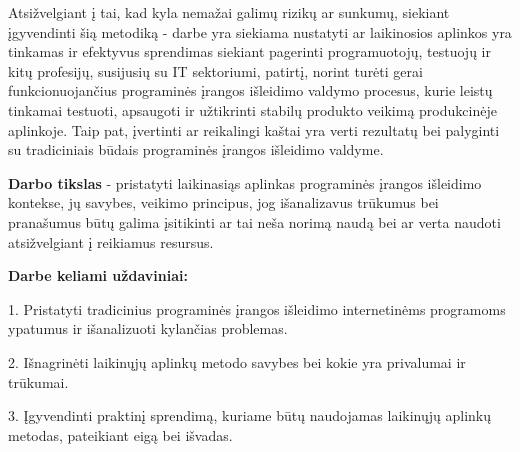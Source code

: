\documentclass{VUMIFPSkursinis}
\begin{document}
 Atsižvelgiant į tai, kad kyla nemažai galimų rizikų ar sunkumų, siekiant įgyvendinti šią metodiką - darbe yra siekiama nustatyti ar laikinosios aplinkos yra tinkamas ir efektyvus sprendimas siekiant pagerinti programuotojų, testuojų ir kitų profesijų, susijusių su IT sektoriumi, patirtį, norint turėti gerai funkcionuojančius programinės įrangos išleidimo valdymo procesus, kurie leistų tinkamai testuoti, apsaugoti ir užtikrinti stabilų produkto veikimą produkcinėje aplinkoje. Taip pat, įvertinti ar reikalingi kaštai yra verti rezultatų bei palyginti su tradiciniais būdais programinės įrangos išleidimo valdyme.

\bigskip



\textbf{Darbo tikslas} - pristatyti laikinasiąs aplinkas programinės įrangos išleidimo kontekse, jų savybes, veikimo principus, jog išanalizavus trūkumus bei pranašumus būtų galima įsitikinti ar tai neša norimą naudą bei ar verta naudoti atsižvelgiant į reikiamus resursus.

\textbf{Darbe keliami uždaviniai:}


1. Pristatyti tradicinius programinės įrangos išleidimo internetinėms programoms ypatumus ir išanalizuoti kylančias problemas.

2. Išnagrinėti laikinųjų aplinkų metodo savybes bei kokie yra privalumai ir trūkumai.

3. Įgyvendinti praktinį sprendimą, kuriame būtų naudojamas laikinųjų aplinkų metodas, pateikiant eigą bei išvadas. 



\end{document}
